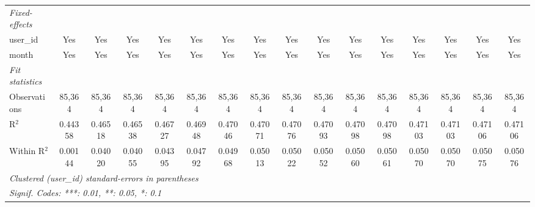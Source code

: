 \begin{table}[htbp]
\begin{tiny}
\begin{tabular}{lccccccccccccccc}
         \midrule \emph{Fixed-effects} &   &   &   &   &   &   &   &   &   &   &   &   &   &   &  \\
         user\_id                & Yes             & Yes             & Yes             & Yes             & Yes             & Yes             & Yes             & Yes             & Yes             & Yes             & Yes             & Yes             & Yes             & Yes             & Yes\\
         month                    & Yes             & Yes             & Yes             & Yes             & Yes             & Yes             & Yes             & Yes             & Yes             & Yes             & Yes             & Yes             & Yes             & Yes             & Yes\\
         \midrule \emph{Fit statistics} &   &   &   &   &   &   &   &   &   &   &   &   &   &   &  \\
         Observations             & 85,364          & 85,364          & 85,364          & 85,364          & 85,364          & 85,364          & 85,364          & 85,364          & 85,364          & 85,364          & 85,364          & 85,364          & 85,364          & 85,364          & 85,364\\
         R$^2$                    & 0.44358         & 0.46518         & 0.46538         & 0.46727         & 0.46948         & 0.47046         & 0.47071         & 0.47076         & 0.47093         & 0.47098         & 0.47098         & 0.47103         & 0.47103         & 0.47106         & 0.47106\\
         Within R$^2$             & 0.00144         & 0.04020         & 0.04055         & 0.04395         & 0.04792         & 0.04968         & 0.05013         & 0.05022         & 0.05052         & 0.05060         & 0.05061         & 0.05070         & 0.05070         & 0.05075         & 0.05076\\
         \midrule\midrule\multicolumn{16}{l}{\emph{Clustered (user\_id) standard-errors in parentheses}}\\
         \multicolumn{16}{l}{\emph{Signif. Codes: ***: 0.01, **: 0.05, *: 0.1}}\\
      \end{tabular}
   \end{tiny}
\end{table}


